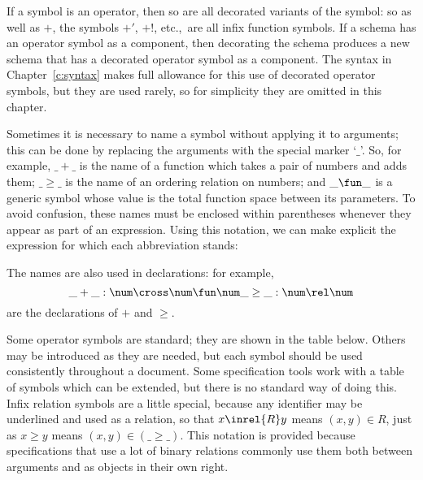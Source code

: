 \new If a symbol is an operator, then so are all decorated variants
of the symbol: so as well as $+$, the symbols $+'$, $+!$, etc.,\ are
all infix function symbols.  If a schema has an operator symbol as a
component, then decorating the schema produces a new schema that has
a decorated operator symbol as a component.  The syntax in
Chapter~\ref{c:syntax} makes full allowance for this use of
decorated operator symbols, but they are used rarely, so for
simplicity they are omitted in this chapter.

Sometimes it is necessary to name a symbol without applying it to
arguments; this can be done by replacing the arguments with the
special marker `$\_$'. So, for example, $\_ + \_$ is the name of a
function which takes a pair of numbers and adds them; $\_ \geq \_$
is the name of an ordering relation on numbers; and $\_ \fun \_$ is
a generic symbol whose value is the total function space between its
parameters. To avoid confusion, these names must be enclosed within
parentheses
whenever they appear as part of an expression. Using this notation,
we can make explicit the expression for which each
abbreviation stands:
\begin{display}
    \jot
\end{display}
The names are also used in declarations: for example,
\[
        \_ + \_: \num \cross \num \fun \num \\
        \_ \geq \_: \num \rel \num
\]
are the declarations of $+$ and $\geq$.

\new Some operator symbols are standard; they are shown in the table
below. Others may be introduced as they are needed, but each symbol
should be used consistently throughout a document. Some
specification tools work with a table of symbols which can be
extended, but there is no standard way of doing this.  Infix
relation symbols are a little special, because any identifier may be
underlined and used as a relation, so that $x \inrel{R} y$ means
$(x, y) \in R$, just as $x \geq y$ means $(x, y) \in (\_ \geq \_)$.
This notation is provided because specifications that use a lot of
binary relations commonly use them both between arguments and as
objects in their own right.

